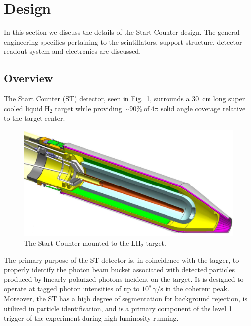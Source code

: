 \section{Design} \label{sec:design}

In this section we discuss the details of the \gx{} Start Counter design.  The general engineering specifics pertaining to the scintillators, support structure, detector readout system and electronics are discussed.

\subsection{Overview} \label{sec:design_overview}
The Start Counter (ST) detector, seen in Fig.~\ref{fig:sttargetiso}, surrounds a 30~cm long super cooled liquid $\mathrm{H_{2}}$ target while providing $\sim 90 \%\ \mathrm{of\ 4 \pi}$ solid angle coverage relative to the target center.
	\begin{figure}[!htb]
		\centering
		\includegraphics[width=1.0\columnwidth]{design/figs/st_target_iso}
		\caption{The \gx{} Start Counter mounted to the $\mathrm{LH_2}$ target.}
		\label{fig:sttargetiso}
	\end{figure}
The primary purpose of the ST detector is, in coincidence with the tagger, to properly identify the photon beam bucket associated with detected particles produced by linearly polarized photons incident on the target. It is designed to operate at tagged photon intensities of up to $10^{8}\,\mathrm{\gamma/s}$ in the coherent peak.  Moreover, the ST has a high degree of segmentation for background rejection, is utilized in particle identification, and is a primary component of the level 1 trigger of the \gx{} experiment during high luminosity running\cite{pooser16}.

